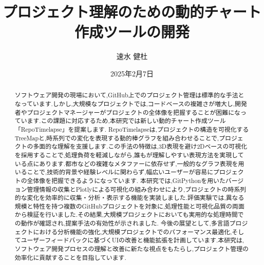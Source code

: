 \documentclass[12pt,twoside]{jbook}
\begin{document}
\title{
プロジェクト理解のための動的チャート作成ツールの開発
}


\author{%
  速水 健杜
}

\date{2025年2月7日}






\maketitle


\begin{abstract}
  ソフトウェア開発の現場において,GitHub上でのプロジェクト管理は標準的な手法となっています.しかし,大規模なプロジェクトでは,コードベースの複雑さが増大し,開発者やプロジェクトマネージャーがプロジェクトの全体像を把握することが困難になっています.この課題に対応するため,本研究では新しい動的チャート作成ツール「RepoTimelapse」を提案します.
  RepoTimelapseは,プロジェクトの構造を可視化するTreeMapと,時系列での変化を表現する動的棒グラフを組み合わせることで,プロジェクトの多面的な理解を支援します.この手法の特徴は,3D表現を避け2Dベースの可視化を採用することで,処理負荷を軽減しながら,誰もが理解しやすい表現方法を実現している点にあります.都市などの複雑なメタファーに依存せず,一般的なグラフ表現を用いることで,技術的背景や経験レベルに関わらず,幅広いユーザーが容易にプロジェクトの全体像を把握できるようになっています.
  本研究では,GitPythonを用いたバージョン管理情報の収集とPlotlyによる可視化の組み合わせにより,プロジェクトの時系列的な変化を効率的に収集・分析・表示する機能を実装しました.評価実験では,異なる規模と特性を持つ複数のGitHubプロジェクトを対象に,処理性能と可視化品質の両面から検証を行いました.その結果,大規模プロジェクトにおいても実用的な処理時間での動作が確認され,提案手法の有効性が示されました.
  今後の展望として,多言語プロジェクトにおける分析機能の強化,大規模プロジェクトでのパフォーマンス最適化,そしてユーザーフィードバックに基づくUIの改善と機能拡張を計画しています.本研究は,ソフトウェア開発プロセスの理解と改善に新たな視点をもたらし,プロジェクト管理の効率化に貢献することを目指しています.
\end{abstract}
\end{document}
